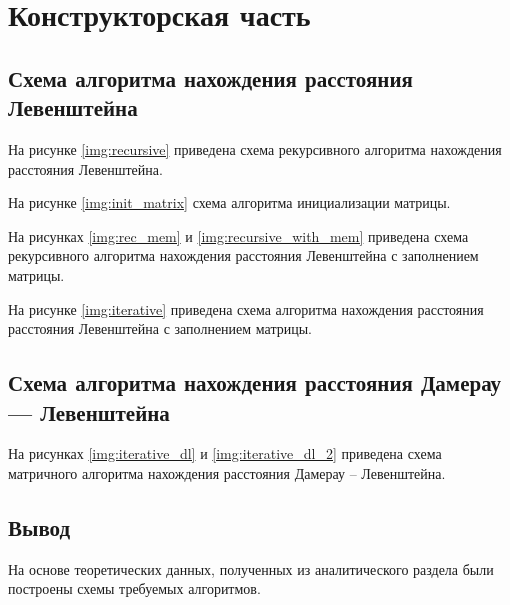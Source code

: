 \chapter{Конструкторская часть}

\section{Схема алгоритма нахождения расстояния Левенштейна}

На рисунке \ref{img:recursive} приведена схема рекурсивного алгоритма нахождения расстояния Левенштейна.

На рисунке \ref{img:init_matrix} схема алгоритма инициализации матрицы.

На рисунках \ref{img:rec_mem} и \ref{img:recursive_with_mem} приведена схема рекурсивного алгоритма нахождения расстояния Левенштейна с заполнением матрицы.

На рисунке \ref{img:iterative} приведена схема алгоритма нахождения расстояния расстояния Левенштейна с заполнением матрицы.

\section{Схема алгоритма нахождения расстояния Дамерау — Левенштейна}

На рисунках \ref{img:iterative_dl} и \ref{img:iterative_dl_2} приведена схема матричного алгоритма нахождения расстояния Дамерау -- Левенштейна.

\section*{Вывод}

На основе теоретических данных, полученных из аналитического раздела были построены схемы требуемых алгоритмов.


